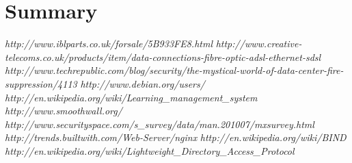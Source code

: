 \documentclass[a4paper, twoside]{article}
\begin{document}
\section{Summary}

\begin{thebibliography}{1}

 {\em http://www.iblparts.co.uk/forsale/5B933FE8.html}
 {\em
  http://www.creative-telecoms.co.uk/products/item/data-connections-fibre-optic-adsl-ethernet-sdsl}
 {\em
  http://www.techrepublic.com/blog/security/the-mystical-world-of-data-center-fire-suppression/4113}
 {\em http://www.debian.org/users/}
 {\em http://en.wikipedia.org/wiki/Learning\_management\_system}
 {\em http://www.smoothwall.org/}
 {\em http://www.securityspace.com/s\_survey/data/man.201007/mxsurvey.html}
 {\em http://trends.builtwith.com/Web-Server/nginx}
 {\em http://en.wikipedia.org/wiki/BIND}
 {\em http://en.wikipedia.org/wiki/Lightweight\_Directory\_Access\_Protocol}

\end{thebibliography}
\end{document}
